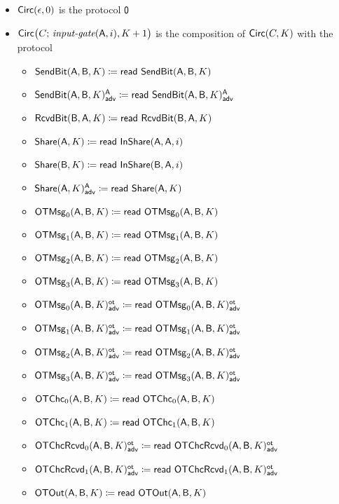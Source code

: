 \begin{itemize}
\item $\Circ(\epsilon,0)$ is the protocol $\zero$

\item $\Circ\big(C; \, \inputgate(\A,i),K+1\big)$ is the composition of $\Circ(C,K)$ with the protocol
\begin{itemize}
\item $\SendBit(\A,\B,K) \coloneqq \read{\SendBit(\A,\B,K)}$
\item {\color{blue} $\LeakSendBit(\A,\B,K)^\A_\adv \coloneqq \read{\LeakSendBit(\A,\B,K)^\A_\adv}$}\smallskip
\item $\RcvdBit(\B,\A,K) \coloneqq \read{\RcvdBit(\B,\A,K)}$\smallskip
\item $\Share(\A,K) \coloneqq \read{\InShare(\A,\A,i)}$
\item $\Share(\B,K) \coloneqq \read{\InShare(\B,\A,i)}$
\item {\color{blue} $\LeakShare(\A,K)^\A_\adv \coloneqq \read{\Share(\A,K)}$}\smallskip
\item $\OTMsg_0(\A,\B,K) \coloneqq \read{\OTMsg_0(\A,\B,K)}$
\item $\OTMsg_1(\A,\B,K) \coloneqq \read{\OTMsg_1(\A,\B,K)}$
\item $\OTMsg_2(\A,\B,K) \coloneqq \read{\OTMsg_2(\A,\B,K)}$
\item $\OTMsg_3(\A,\B,K) \coloneqq \read{\OTMsg_3(\A,\B,K)}$\smallskip
\item {\color{blue} $\LeakOTMsg_0(\A,\B,K)^\ot_\adv \coloneqq \read{\LeakOTMsg_0(\A,\B,K)^\ot_\adv}$}
\item {\color{blue} $\LeakOTMsg_1(\A,\B,K)^\ot_\adv \coloneqq \read{\LeakOTMsg_1(\A,\B,K)^\ot_\adv}$}
\item {\color{blue} $\LeakOTMsg_2(\A,\B,K)^\ot_\adv \coloneqq \read{\LeakOTMsg_2(\A,\B,K)^\ot_\adv}$}
\item {\color{blue} $\LeakOTMsg_3(\A,\B,K)^\ot_\adv \coloneqq \read{\LeakOTMsg_3(\A,\B,K)^\ot_\adv}$}\smallskip
\item $\OTChc_0(\A,\B,K) \coloneqq \read{\OTChc_0(\A,\B,K)}$
\item $\OTChc_1(\A,\B,K) \coloneqq \read{\OTChc_1(\A,\B,K)}$\smallskip
\item {\color{blue} $\LeakOTChcRcvd_0(\A,\B,K)^\ot_\adv \coloneqq \read{\LeakOTChcRcvd_0(\A,\B,K)^\ot_\adv}$}
\item {\color{blue} $\LeakOTChcRcvd_1(\A,\B,K)^\ot_\adv \coloneqq \read{\LeakOTChcRcvd_1(\A,\B,K)^\ot_\adv}$}\smallskip
\item $\OTOut(\A,\B,K) \coloneqq \read{\OTOut(\A,\B,K)}$
\end{itemize}


\end{itemize}
